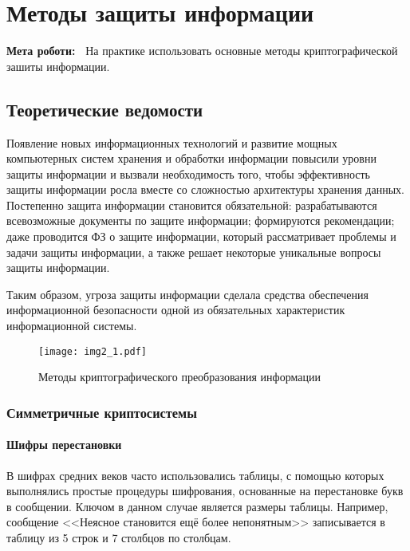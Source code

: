 \chapter{Методы защиты информации} \label{chapt2}%
\textbf{Мета роботи:~}%
На практике использовать основные методы криптографической зашиты информации.
\section{Теоретические ведомости} \label{sect8_a}
%
Появление новых информационных технологий и развитие мощных компьютерных
систем хранения и обработки информации повысили уровни защиты информации и
вызвали необходимость того, чтобы эффективность защиты информации росла
вместе со сложностью архитектуры хранения данных. Постепенно защита
информации становится обязательной: разрабатываются всевозможные документы по
защите информации; формируются рекомендации; даже проводится ФЗ о защите
информации, который рассматривает проблемы и задачи защиты информации, а
также решает некоторые уникальные вопросы защиты информации.

Таким образом, угроза защиты информации сделала средства обеспечения
информационной безопасности одной из обязательных характеристик
информационной системы.

\begin{figure}[h]
  \centering
  \texttt{[image: img2\_1.pdf]}
  \caption{Методы криптографического преобразования информации}\label{img:img2_1}
\end{figure}



\subsection{Симметричные криптосистемы}
\subsubsection{Шифры перестановки}
В шифрах средних веков часто использовались таблицы, с помощью которых
выполнялись простые процедуры шифрования, основанные на перестановке букв в
сообщении. Ключом в данном случае является размеры таблицы. Например,
сообщение <<Неясное становится ещё более непонятным>> записывается в таблицу
из 5 строк и 7 столбцов по столбцам.

